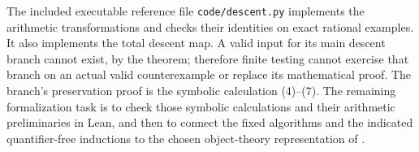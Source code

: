 The included executable reference file \texttt{code/descent.py} implements
the arithmetic transformations and checks their identities on exact rational
examples.  It also implements the total descent map.  A valid input for its
main descent branch cannot exist, by the theorem; therefore finite testing
cannot exercise that branch on an actual valid counterexample or replace
its mathematical proof.  The branch's preservation proof is the symbolic
calculation (4)--(7).  The remaining formalization task is to check those
symbolic calculations and their arithmetic preliminaries in Lean, and then
to connect the fixed algorithms and the indicated quantifier-free
inductions to the chosen object-theory representation of \iPRA.
